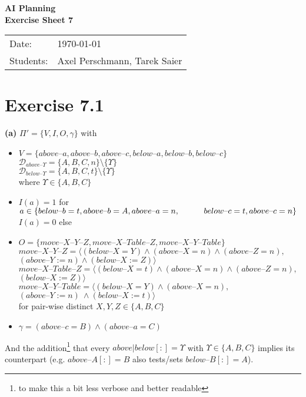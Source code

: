 \documentclass[11pt,a4paper]{article}
\newcommand{\sheetNr}{7}
\newcommand{\h}[0]{\text{--}}
\begin{document}
\begin{center}
\Huge{\textbf{AI Planning}}\\
\LARGE{\textbf{Exercise Sheet \sheetNr}}
\end{center}
\vspace{2cm}
\begin{tabular}{ll}
Date: & \today\\
Students: & Axel Perschmann, Tarek Saier
\end{tabular}

\section*{Exercise 7.1}
\textbf{(a)} $\Pi'=\{V,I,O,\gamma\}$ with\\
\begin{itemize}
\item $V=\{above\h a,above\h b,above\h c,below\h a,below\h b,below\h c\}$\\
$\mathscr{D}_{above\h\Upsilon}=\{A,B,C,n\}\setminus\{\Upsilon\}$\\
$\mathscr{D}_{below\h\Upsilon}=\{A,B,C,t\}\setminus\{\Upsilon\}$\\
where $\Upsilon\in\{A,B,C\}$

\item $I(a)=1$ for $a\in \{below\h b=t,above\h b=A,above\h a=n,\\
\hphantom{wwww}below\h c=t,above\h c=n\}$\\
$I(a)=0$ else

\item $O=\{move\h X\h Y\h Z,move\h X\h Table\h Z,move\h X\h Y\h Table\}$\\
$move\h X\h Y\h Z=\langle (below\h X=Y) \land (above\h X=n) \land (above\h Z=n),$\\
\hphantom{wwww}$(above\h Y:=n) \land (below\h X:=Z) \rangle$\\
$move\h X\h Table\h Z=\langle(below\h X=t) \land (above\h X=n) \land (above\h Z=n),$\\
\hphantom{wwww}$(below\h X:=Z)\rangle$\\
$move\h X\h Y\h Table=\langle(below\h X=Y) \land (above\h X=n),$\\
\hphantom{wwww}$(above\h Y:=n)\ \land (below\h X:=t)\rangle$\\
for pair-wise distinct $X,Y,Z\in\{A,B,C\}$

\item $\gamma=(above\h c=B)\land(above\h a=C)$
\end{itemize}
And the addition\footnote{to make this a bit less verbose and better readable} that every $above|below[:]$$=\Upsilon$ with $\Upsilon\in\{A,B,C\}$ implies its counterpart (e.g. $above\h A[:]$$=B$ also tests/sets $below\h B[:]=A$).\\
\end{document}
